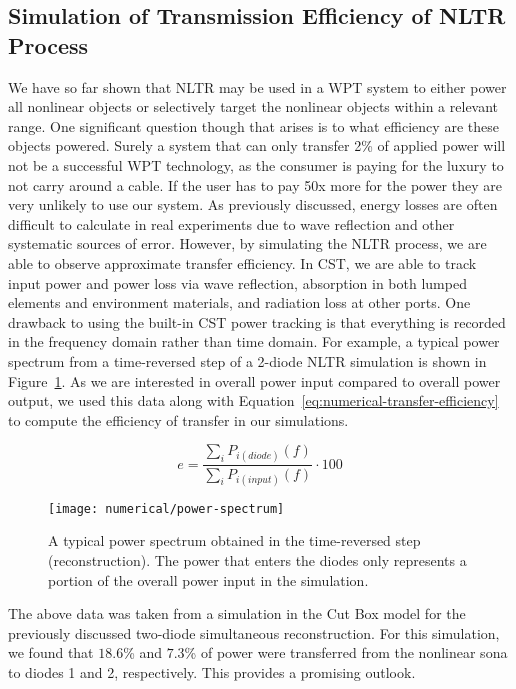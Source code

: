 \subsection{Simulation of Transmission Efficiency of NLTR Process}

We have so far shown that NLTR may be used in a WPT system to either power all nonlinear objects or selectively target the nonlinear objects within a relevant range. One significant question though that arises is to what efficiency are these objects powered. Surely a system that can only transfer 2\% of applied power will not be a successful WPT technology, as the consumer is paying for the luxury to not carry around a cable. If the user has to pay 50x more for the power they are very unlikely to use our system.
As previously discussed, energy losses are often difficult to calculate in real experiments due to wave reflection and other systematic sources of error. However, by simulating the NLTR process, we are able to observe approximate transfer efficiency. In CST, we are able to track input power and power loss via wave reflection, absorption in both lumped elements and environment materials, and radiation loss at other ports. One drawback to using the built-in CST power tracking is that everything is recorded in the frequency domain rather than time domain. For example, a typical power spectrum from a time-reversed step of a 2-diode NLTR simulation is shown in Figure~\ref{fig:numerical-power-spectrum}. As we are interested in overall power input compared to overall power output, we used this data along with Equation~\ref{eq:numerical-transfer-efficiency} to compute the efficiency of transfer in our simulations.

\begin{equation}
e = \frac{\sum_{i}P_{i(diode)}(f)}{\sum_{i}P_{i(input)}(f)} \cdot 100
\label{eq:numerical-transfer-efficiency}
\end{equation}

\begin{figure}[t]
\centering
\texttt{[image: numerical/power-spectrum]}
\caption[Transfer efficiency for a two-diode simultaneous reconstruction]{A typical power spectrum obtained in the time-reversed step (reconstruction). The power that enters the diodes only represents a portion of the overall power input in the simulation.}
\label{fig:numerical-power-spectrum}
\end{figure}

The above data was taken from a simulation in the Cut Box model for the previously discussed two-diode simultaneous reconstruction. For this simulation, we found that $18.6$\% and $7.3$\% of power were transferred from the nonlinear sona to diodes 1 and 2, respectively.  This provides a promising outlook.

